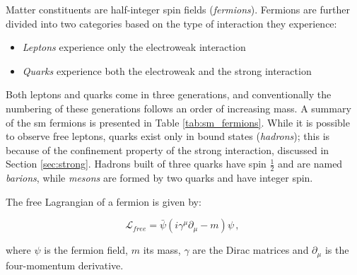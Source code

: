 Matter constituents are half-integer spin fields (\textit{fermions}). Fermions are further divided into two categories based on the type of interaction they experience:
\begin{itemize}
\item \textit{Leptons} experience only the electroweak interaction
\item \textit{Quarks} experience both the electroweak and the strong interaction
\end{itemize}

Both leptons and quarks come in three generations, and conventionally the numbering of these generations follows an order of increasing mass. A summary of the \gls{sm} fermions is presented in Table \ref{tab:sm_fermions}. While it is possible to observe free leptons, quarks exist only in bound states (\textit{hadrons}); this is because of the confinement property of the strong interaction, discussed in Section \ref{sec:strong}. Hadrons built of three quarks have spin $\frac{1}{2}$ and are named \textit{barions}, while \textit{mesons} are formed by two quarks and have integer spin.


The free Lagrangian of a fermion is given by:

\begin{equation}
 \mathcal{L}_{free} = \bar{\psi} \left( i \gamma^{\mu} \partial_{\mu} - m \right) \psi \, , \
 \label{eq:sm:dirac}
\end{equation}

\noindent where $\psi$ is the fermion field, $m$ its mass, $\gamma$ are the Dirac matrices and $\partial_{\mu}$ is the four-momentum derivative. 

